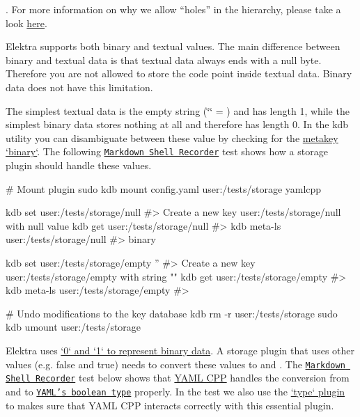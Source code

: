 . For more information on why we allow “holes” in the hierarchy, please take a look \hyperlink{doc_decisions_holes_md}{here}.

Elektra supports both binary and textual values. The main difference between binary and textual data is that textual data always ends with a null byte. Therefore you are not allowed to store the code point {} inside textual data. Binary data does not have this limitation.

The simplest textual data is the empty string ({\ttfamily \char`\"{}\char`\"{}} = {}) and has length 1, while the simplest binary data stores nothing at all and therefore has length 0. In the {\ttfamily kdb} utility you can disambiguate between these value by checking for the \hyperlink{doc_help_elektra-metadata_md}{metakey `binary`}. The following \href{https://master.libelektra.org/tests/shell/shell_recorder/tutorial_wrapper}{\tt Markdown Shell Recorder} test shows how a storage plugin should handle these values.


\begin{DoxyCode}
# Mount plugin
sudo kdb mount config.yaml user:/tests/storage yamlcpp

kdb set user:/tests/storage/null
#> Create a new key user:/tests/storage/null with null value
kdb get user:/tests/storage/null
#>
kdb meta-ls user:/tests/storage/null
#> binary

kdb set user:/tests/storage/empty ''
#> Create a new key user:/tests/storage/empty with string ""
kdb get user:/tests/storage/empty
#>
kdb meta-ls user:/tests/storage/empty
#>

# Undo modifications to the key database
kdb rm -r user:/tests/storage
sudo kdb umount user:/tests/storage
\end{DoxyCode}


Elektra uses \hyperlink{doc_decisions_boolean_md}{`0` and `1` to represent binary data}. A storage plugin that uses other values (e.\+g. {\ttfamily false} and {\ttfamily true}) needs to convert these values to {} and {}. The \href{https://master.libelektra.org/tests/shell/shell_recorder/tutorial_wrapper}{\tt Markdown Shell Recorder} test below shows that \hyperlink{autotoc_md807_src_plugins_yamlcpp_README_md}{Y\+A\+ML C\+PP} handles the conversion from and to \href{https://yaml.org/spec/1.2/spec.html#id2803629}{\tt Y\+A\+M\+L’s boolean type} properly. In the test we also use the \hyperlink{autotoc_md745_src_plugins_type_README_md}{`type` plugin} to makes sure that Y\+A\+ML C\+PP interacts correctly with this essential plugin.



